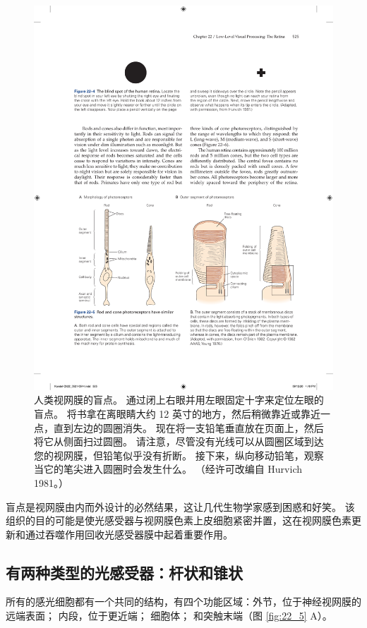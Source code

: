\begin{figure}[htbp]
	\centering
	\includegraphics[width=0.7\linewidth]{chap22/fig_22_4}
	\caption{人类视网膜的盲点。 
		通过闭上右眼并用左眼固定十字来定位左眼的盲点。 
		将书拿在离眼睛大约 12 英寸的地方，然后稍微靠近或靠近一点，直到左边的圆圈消失。 
		现在将一支铅笔垂直放在页面上，然后将它从侧面扫过圆圈。 
		请注意，尽管没有光线可以从圆圈区域到达您的视网膜，但铅笔似乎没有折断。 
		接下来，纵向移动铅笔，观察当它的笔尖进入圆圈时会发生什么。 （经许可改编自 Hurvich 1981。）}
	\label{fig:22_4}
\end{figure}


盲点是视网膜由内而外设计的必然结果，这让几代生物学家感到困惑和好笑。
该组织的目的可能是使光感受器与视网膜色素上皮细胞紧密并置，这在视网膜色素更新和通过吞噬作用回收光感受器膜中起着重要作用。


\subsection{有两种类型的光感受器：杆状和锥状}

所有的感光细胞都有一个共同的结构，有四个功能区域：外节，位于神经视网膜的远端表面； 内段，位于更近端； 细胞体； 和突触末端（图 \ref{fig:22_5} A）。

